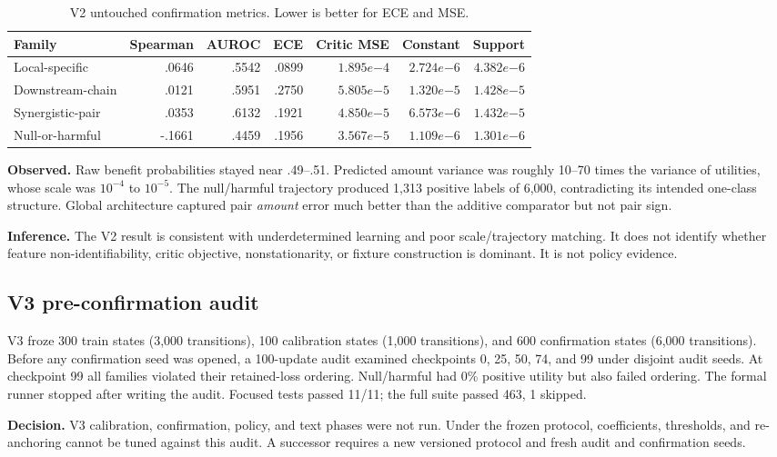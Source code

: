 \documentclass[11pt]{article}
\newcommand{\obs}{\textbf{Observed.} }
\newcommand{\inferr}{\textbf{Inference.} }
\newcommand{\decision}{\textbf{Decision.} }
\begin{document}
\begin{table}[h]
\centering
\caption{V2 untouched confirmation metrics. Lower is better for ECE and MSE.}
\begin{tabular}{lrrrrrr}
\toprule
Family & Spearman & AUROC & ECE & Critic MSE & Constant & Support\\
\midrule
Local-specific & .0646 & .5542 & .0899 & $1.895e{-4}$ & $2.724e{-6}$ & $4.382e{-6}$\\
Downstream-chain & .0121 & .5951 & .2750 & $5.805e{-5}$ & $1.320e{-5}$ & $1.428e{-5}$\\
Synergistic-pair & .0353 & .6132 & .1921 & $4.850e{-5}$ & $6.573e{-6}$ & $1.432e{-5}$\\
Null-or-harmful & -.1661 & .4459 & .1956 & $3.567e{-5}$ & $1.109e{-6}$ & $1.301e{-6}$\\
\bottomrule
\end{tabular}
\end{table}

\obs Raw benefit probabilities stayed near .49--.51. Predicted amount variance was roughly 10--70 times the variance of utilities, whose scale was $10^{-4}$ to $10^{-5}$. The null/harmful trajectory produced 1,313 positive labels of 6,000, contradicting its intended one-class structure. Global architecture captured pair \emph{amount} error much better than the additive comparator but not pair sign.

\inferr The V2 result is consistent with underdetermined learning and poor scale/trajectory matching. It does not identify whether feature non-identifiability, critic objective, nonstationarity, or fixture construction is dominant. It is not policy evidence.

\subsection{V3 pre-confirmation audit}
V3 froze 300 train states (3,000 transitions), 100 calibration states (1,000 transitions), and 600 confirmation states (6,000 transitions). Before any confirmation seed was opened, a 100-update audit examined checkpoints 0, 25, 50, 74, and 99 under disjoint audit seeds. At checkpoint 99 all families violated their retained-loss ordering. Null/harmful had 0\% positive utility but also failed ordering. The formal runner stopped after writing the audit. Focused tests passed 11/11; the full suite passed 463, 1 skipped.

\decision V3 calibration, confirmation, policy, and text phases were not run. Under the frozen protocol, coefficients, thresholds, and re-anchoring cannot be tuned against this audit. A successor requires a new versioned protocol and fresh audit and confirmation seeds.
\end{document}
